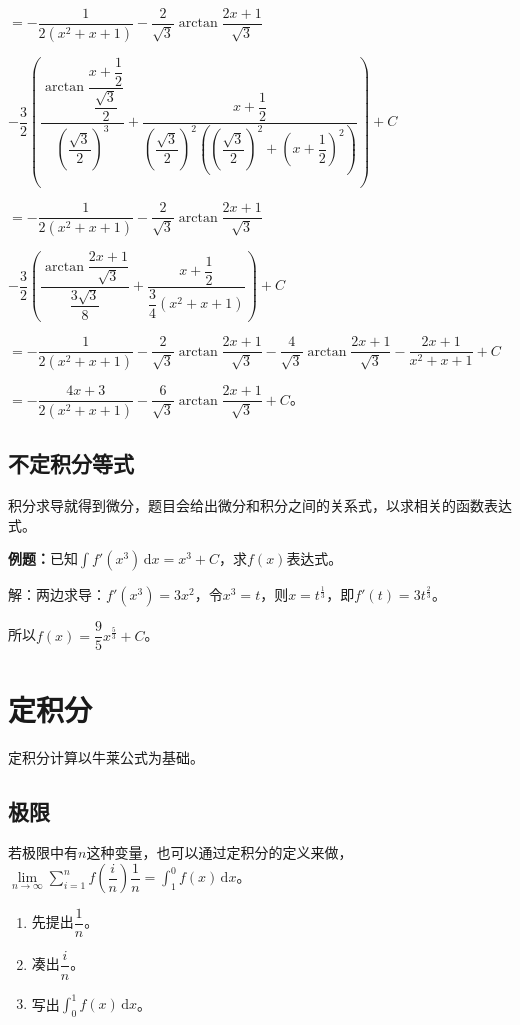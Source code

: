\documentclass[UTF8, 12pt]{ctexart}
\begin{document}
$=-\dfrac{1}{2(x^2+x+1)}-\dfrac{2}{\sqrt{3}}\arctan\dfrac{2x+1}{\sqrt{3}}$

$-\dfrac{3}{2}\left(\dfrac{\arctan\dfrac{x+\dfrac{1}{2}}{\dfrac{\sqrt{3}}{2}}}{\left(\dfrac{\sqrt{3}}{2}\right)^3}+\dfrac{x+\dfrac{1}{2}}{\left(\dfrac{\sqrt{3}}{2}\right)^2\left(\left(\dfrac{\sqrt{3}}{2}\right)^2+\left(x+\dfrac{1}{2}\right)^2\right)}\right)+C$

$=-\dfrac{1}{2(x^2+x+1)}-\dfrac{2}{\sqrt{3}}\arctan\dfrac{2x+1}{\sqrt{3}}$

$-\dfrac{3}{2}\left(\dfrac{\arctan\dfrac{2x+1}{\sqrt{3}}}{\dfrac{3\sqrt{3}}{8}}+\dfrac{x+\dfrac{1}{2}}{\dfrac{3}{4}\left(x^2+x+1\right)}\right)+C$

$=-\dfrac{1}{2(x^2+x+1)}-\dfrac{2}{\sqrt{3}}\arctan\dfrac{2x+1}{\sqrt{3}}-\dfrac{4}{\sqrt{3}}\arctan\dfrac{2x+1}{\sqrt{3}}-\dfrac{2x+1}{x^2+x+1}+C$

$=-\dfrac{4x+3}{2(x^2+x+1)}-\dfrac{6}{\sqrt{3}}\arctan\dfrac{2x+1}{\sqrt{3}}+C$。

\subsection{不定积分等式}

积分求导就得到微分，题目会给出微分和积分之间的关系式，以求相关的函数表达式。

\textbf{例题：}已知$\int f'(x^3)\,\textrm{d}x=x^3+C$，求$f(x)$表达式。

解：两边求导：$f'(x^3)=3x^2$，令$x^3=t$，则$x=t^\frac{1}{3}$，即$f'(t)=3t^\frac{2}{3}$。

所以$f(x)=\dfrac{9}{5}x^\frac{5}{3}+C$。

\section{定积分}

定积分计算以牛莱公式为基础。

\subsection{极限}

若极限中有$n$这种变量，也可以通过定积分的定义来做，$\lim\limits_{n\to\infty}\sum\limits_{i=1}^nf\left(\dfrac{i}{n}\right)\dfrac{1}{n}=\int_1^0f(x)\,\textrm{d}x$。

\begin{enumerate}
    \item 先提出$\dfrac{1}{n}$。
    \item 凑出$\dfrac{i}{n}$。
    \item 写出$\int_0^1f(x)\,\textrm{d}x$。
\end{enumerate}
\end{document}

